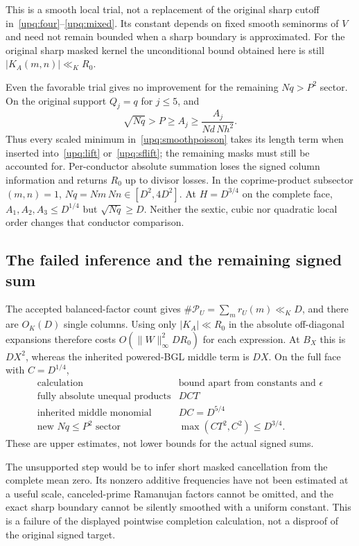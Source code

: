 This is a smooth local trial, not a replacement of the original sharp
cutoff in~\eqref{upq:four}--\eqref{upq:mixed}.
Its constant depends on fixed smooth seminorms of $V$ and need not remain
bounded when a sharp boundary is approximated. For the original sharp
masked kernel the unconditional bound obtained here is still
$|K_A(m,n)|\ll_KR_0$.

Even the favorable trial gives no improvement for the remaining
$Nq>P^2$ sector. On the original support $Q_j=q$ for $j\le5$, and
\[
 \sqrt{Nq}>P\ge A_j\ge
       \frac{A_j}{Nd\,Nh^2}.
\]
Thus every scaled minimum in~\eqref{upq:smoothpoisson} takes its length
term when inserted into~\eqref{upq:lift} or~\eqref{upq:sflift};
the remaining masks must still be accounted for. Per-conductor
absolute summation loses the signed column information and returns
$R_0$ up to divisor losses. In the coprime-product subsector $(m,n)=1$,
$Nq=Nm\,Nn\in[D^2,4D^2]$. At $H=D^{3/4}$ on the complete face,
$A_1,A_2,A_3\le D^{1/4}$ but $\sqrt{Nq}\ge D$.
Neither the sextic, cubic nor quadratic local order changes that
conductor comparison.

\subsection{The failed inference and the remaining signed sum}
The accepted balanced-factor count gives
$\#\mathcal P_U=\sum_mr_U(m)\ll_KD$, and there are $O_K(D)$
single columns. Using only $|K_A|\ll R_0$ in the absolute off-diagonal
expansions therefore costs $O(\|W\|_\infty^2DR_0)$ for each expression.
At $B_X$ this is $DX^2$, whereas the inherited powered-BGL middle
term is $DX$. On the full face with $C=D^{1/4}$,
\[
 \begin{array}{c|c}
 \text{calculation}&\text{bound apart from constants and }\epsilon\\ \hline
 \text{fully absolute unequal products}&DCT\\
 \text{inherited middle monomial}&DC=D^{5/4}\\
 \text{new }Nq\le P^2\text{ sector}&
       \max(CT^2,C^2)\le D^{3/4}.
 \end{array}
\]
These are upper estimates, not lower bounds for the actual signed sums.

The unsupported step would be to infer short masked cancellation from
the complete mean zero. Its nonzero additive frequencies have not been
estimated at a useful scale, canceled-prime Ramanujan factors cannot be
omitted, and the exact sharp boundary cannot be silently smoothed with
a uniform constant. This is a failure of the displayed pointwise
completion calculation, not a disproof of the original signed target.

